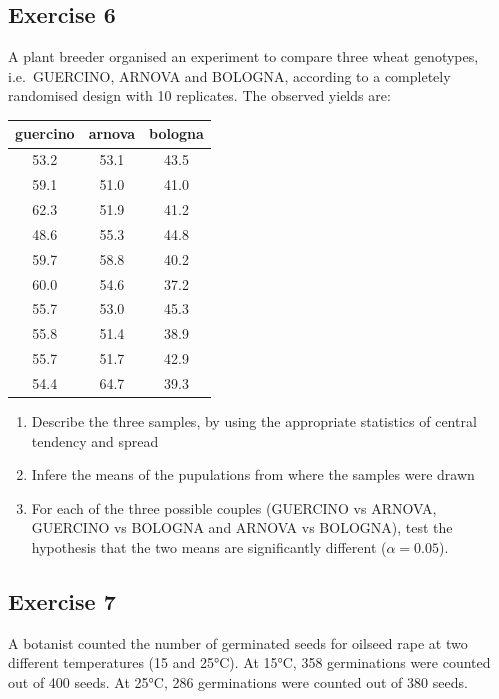 \documentclass[a4paper,12pt,oneside]{book}
\providecommand{\tightlist}{%
  \setlength{\itemsep}{0pt}\setlength{\parskip}{0pt}}
\begin{document}
\hypertarget{exercise-6-1}{%
\subsection{Exercise 6}\label{exercise-6-1}}

A plant breeder organised an experiment to compare three wheat genotypes, i.e.~GUERCINO, ARNOVA and BOLOGNA, according to a completely randomised design with 10 replicates. The observed yields are:

\begin{tabular}{c|c|c}
\hline
guercino & arnova & bologna\\
\hline
53.2 & 53.1 & 43.5\\
\hline
59.1 & 51.0 & 41.0\\
\hline
62.3 & 51.9 & 41.2\\
\hline
48.6 & 55.3 & 44.8\\
\hline
59.7 & 58.8 & 40.2\\
\hline
60.0 & 54.6 & 37.2\\
\hline
55.7 & 53.0 & 45.3\\
\hline
55.8 & 51.4 & 38.9\\
\hline
55.7 & 51.7 & 42.9\\
\hline
54.4 & 64.7 & 39.3\\
\hline
\end{tabular}

\begin{enumerate}
\def\labelenumi{\arabic{enumi}.}
\tightlist
\item
  Describe the three samples, by using the appropriate statistics of central tendency and spread
\item
  Infere the means of the pupulations from where the samples were drawn
\item
  For each of the three possible couples (GUERCINO vs ARNOVA, GUERCINO vs BOLOGNA and ARNOVA vs BOLOGNA), test the hypothesis that the two means are significantly different (\(\alpha = 0.05\)).
\end{enumerate}

\hypertarget{exercise-7}{%
\subsection{Exercise 7}\label{exercise-7}}

A botanist counted the number of germinated seeds for oilseed rape at two different temperatures (15 and 25°C). At 15°C, 358 germinations were counted out of 400 seeds. At 25°C, 286 germinations were counted out of 380 seeds.
\end{document}
